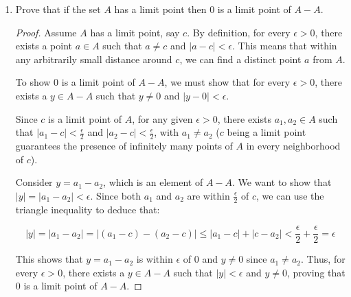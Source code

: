 \documentclass[10pt]{article}
\newenvironment{problem}[2][Problem]{\begin{trivlist}
\item[\hskip \labelsep {\bfseries #1}\hskip \labelsep {\bfseries #2.}]}{\end{trivlist}}
\begin{document}
\begin{problem}{4}
\begin{enumerate}
            \item Prove that if the set $ A $ has a limit point then $ 0 $ is a limit point of $ A-A $.
            \begin{proof}
                Assume $A$ has a limit point, say $c$. By definition, for every $\epsilon > 0$, there exists a point $a \in A$ such that $a \neq c$ and $|a - c| < \epsilon$. This means that within any arbitrarily small distance around $c$, we can find a distinct point $a$ from $A$.

To show $0$ is a limit point of $A-A$, we must show that for every $\epsilon > 0$, there exists a $y \in A-A$ such that $y \neq 0$ and $|y - 0| < \epsilon$.

Since $c$ is a limit point of $A$, for any given $\epsilon > 0$, there exists $a_1, a_2 \in A$ such that $|a_1 - c| < \frac{\epsilon}{2}$ and $|a_2 - c| < \frac{\epsilon}{2}$, with $a_1 \neq a_2$ ($c$ being a limit point guarantees the presence of infinitely many points of $A$ in every neighborhood of $c$).

Consider $y = a_1 - a_2$, which is an element of $A-A$. We want to show that $|y| = |a_1 - a_2| < \epsilon$. Since both $a_1$ and $a_2$ are within $\frac{\epsilon}{2}$ of $c$, we can use the triangle inequality to deduce that:

$$|y| = |a_1 - a_2| = |(a_1 - c) - (a_2 - c)| \leq |a_1 - c| + |c - a_2| < \frac{\epsilon}{2} + \frac{\epsilon}{2} = \epsilon$$


This shows that $y = a_1 - a_2$ is within $\epsilon$ of $0$ and $y \neq 0$ since $a_1 \neq a_2$. Thus, for every $\epsilon > 0$, there exists a $y \in A-A$ such that $|y| < \epsilon$ and $y \neq 0$, proving that $0$ is a limit point of $A-A$.
            \end{proof}

	\end{enumerate}
\end{problem}
\medskip
\end{document}
